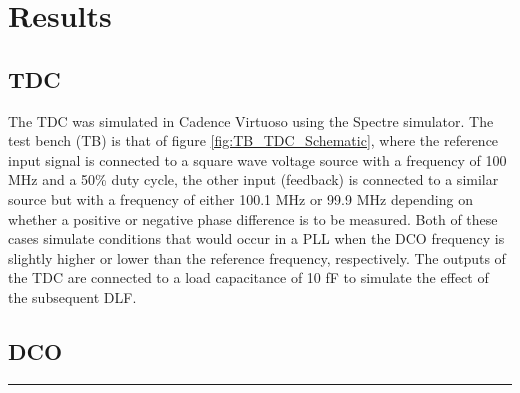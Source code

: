\chapter{Results}

\section{TDC}
The TDC was simulated in Cadence Virtuoso using the Spectre simulator. The test bench (TB) is that of figure \ref{fig:TB_TDC_Schematic}, where the reference input signal is connected
to a square wave voltage source with a frequency of 100 MHz and a 50\% duty cycle, the other input (feedback) is connected to a similar source but with a frequency of either 100.1 MHz
or 99.9 MHz depending on whether a positive or negative phase difference is to be measured. Both of these cases simulate conditions that would occur in a PLL when the DCO frequency is
slightly higher or lower than the reference frequency, respectively. The outputs of the TDC are connected to a load capacitance of 10 fF to simulate the effect of the subsequent DLF.


\section{DCO}

\noindent\rule{\textwidth}{1pt}